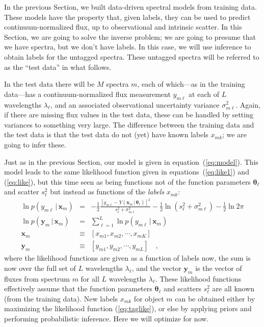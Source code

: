 \documentclass[12pt, preprint]{aastex}
\newcommand{\sectionname}{Section}
\newcommand{\set}[1]{\bm{#1}}
\newcommand{\given}{\,|\,}
\begin{document}
In the previous \sectionname, we built data-driven spectral models
from training data.
These models have the property that, given labels, they can be used to
predict continuum-normalized flux, up to observational and intrinsic
scatter.
In this \sectionname, we are going to solve the inverse problem; we
are going to presume that we have spectra, but we don't have labels.
In this case, we will use inference to obtain labels for the untagged
spectra.
These untagged spectra will be referred to as the ``test data'' in
what follows.

In the test data there will be $M$ spectra $m$, each of which---as in
the training data---has a continuum-normalized flux measurement
$y_{m\ell}$ at each of $L$ wavelengths $\lambda_\ell$, and an
associated observational uncertainty variance $\sigma_{m\ell}^2$.
Again, if there are missing flux values in the test data, these can be
handled by setting variances to something very large.
The difference between the training data and the test data is that the
test data do not (yet) have known labels $x_{mk}$; we are going to infer
these.

Just as in the previous \sectionname, our model is given in
equation~(\ref{eq:model}).
This model leads to the same likelihood function given in
equations~(\ref{eq:like1}) and (\ref{eq:like}), but this time seen as
being functions not of the function parameters $\set{\theta}_\ell$ and
scatter $s_\ell^2$ but instead as functions of the \emph{labels}
$x_{mk}$:
\begin{eqnarray}
\ln p(y_{m\ell}\given\set{x}_m) &=&
 -\frac{1}{2}\frac{[y_{m\ell} - Y(\set{x}_m\given\set{\theta}_\ell)]^2}{s_\ell^2 + \sigma_{m\ell}^2}
 -\frac{1}{2}\ln(s_\ell^2 + \sigma_{m\ell}^2)
 -\frac{1}{2}\ln 2\pi
\\
\ln p(\set{y}_m\given\set{x}_m) &=&
 \sum_{\ell=1}^L \ln p(y_{m\ell}\given\set{x}_m)
\label{eq:taglike}\\
\set{x}_m &\equiv& [x_{m1}, x_{m2}, \cdots, x_{mK}]
\\
\set{y}_m &\equiv& [y_{m1}, y_{m2}, \cdots, y_{mL}]
\quad,
\end{eqnarray}
where the likelihood functions are given as a function of labels now,
the sum is now over the full set of $L$ wavelengths
$\lambda_\ell$, and the vector $\set{y}_m$ is the vector of fluxes from
spectrum $m$ for all $L$ wavelengths $\lambda_\ell$.
These likelihood functions effectively assume that the function
parameters $\set{\theta}_\ell$ and scatters $s_\ell^2$ are all known (from
the training data).
New labels $x_{mk}$ for object $m$ can be obtained either by maximizing
the likelihood function (\ref{eq:taglike}), or else by applying priors
and performing probabilistic inference.
Here we will optimize for now.
\end{document}
